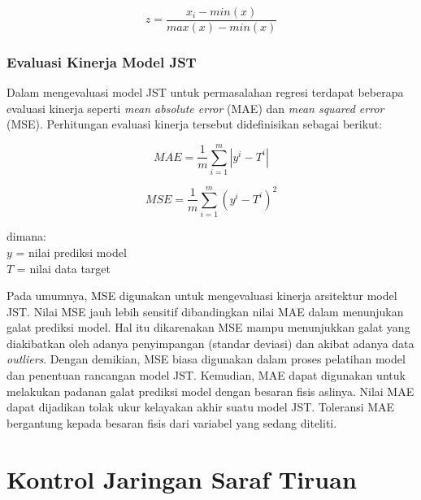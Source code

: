 \begin{equation} \label{eq:3:MinMaxScaler}
z = \frac{x_i - min(x)}{max(x) - min(x)}
\end{equation}

\subsubsection{Evaluasi Kinerja Model JST}

Dalam mengevaluasi model JST untuk permasalahan regresi terdapat beberapa evaluasi kinerja seperti \textit{mean absolute error} (MAE) dan \textit{mean squared error} (MSE). Perhitungan evaluasi kinerja tersebut didefinisikan sebagai berikut:

\begin{equation} \label{eq:3:MAEequation}
	MAE = \frac{1}{m} \sum_{i=1}^{m} |y^i-T^i|
\end{equation}

\begin{equation} \label{eq:3:MSEequation}
	MSE = \frac{1}{m} \sum_{i=1}^{m} (y^i-T^i)^2
\end{equation}

\noindent dimana:\\
$y$ = nilai prediksi model\\
$T$ = nilai data target

Pada umumnya, MSE digunakan untuk mengevaluasi kinerja arsitektur model JST. Nilai MSE jauh lebih sensitif dibandingkan nilai MAE dalam menunjukan galat prediksi model. Hal itu dikarenakan MSE mampu menunjukkan galat yang diakibatkan oleh adanya penyimpangan (standar deviasi) dan akibat adanya data \textit{outliers}. Dengan demikian, MSE biasa digunakan dalam proses pelatihan model dan penentuan rancangan model JST. Kemudian, MAE dapat digunakan untuk melakukan padanan galat prediksi model dengan besaran fisis aslinya. Nilai MAE dapat dijadikan tolak ukur kelayakan akhir suatu model JST. Toleransi MAE bergantung kepada besaran fisis dari variabel yang sedang diteliti.\cite{HandsOnML}

\section{Kontrol Jaringan Saraf Tiruan}


